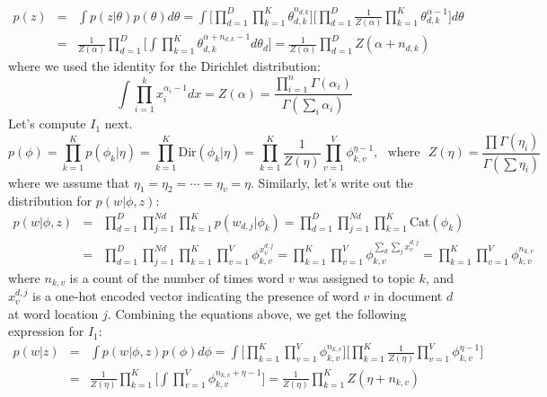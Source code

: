 \begin{eqnarray}
p(z) &=& \int p(z|\theta) p(\theta) d\theta = \int \bigg[\prod_{d=1}^{D}\prod_{k=1}^{K}\theta_{d,k}^{n_{d,k}}\bigg] \bigg[\prod_{d=1}^{D}\frac{1}{Z(\alpha)}\prod_{k=1}^{K}\theta_{d,k}^{\alpha - 1}\bigg] d\theta \nonumber \\
&=& \frac{1}{Z(\alpha)}\prod_{d=1}^{D}\bigg[ \int \prod_{k=1}^{K}\theta_{d,k}^{\alpha + n_{d,k} - 1} d\theta_d \bigg] = \frac{1}{Z(\alpha)}\prod_{d=1}^{D}Z(\alpha + n_{d,k})
\end{eqnarray}
where we used the identity for the Dirichlet distribution:
\begin{equation}
    \int \prod_{i=1}^{k} x_{i}^{\alpha_i - 1} dx = Z(\alpha) = \frac{\prod_{i=1}^{n}\Gamma(\alpha_i)}{\Gamma(\sum_i \alpha_i)}
\end{equation}
Let's compute $I_1$ next.
\begin{equation}
    p(\phi) = \prod_{k=1}^{K}p(\phi_k|\eta) = \prod_{k=1}^{K}\mathrm{Dir}(\phi_k|\eta) = \prod_{k=1}^{K}\frac{1}{Z(\eta)}\prod_{v=1}^{V}\phi_{k,v}^{\eta - 1}, ~~~\mathrm{where}~~~Z(\eta) = \frac{\prod \Gamma(\eta_i)}{\Gamma(\sum \eta_i)}
\end{equation}
where we assume that $\eta_1 = \eta_2 = \cdots = \eta_v = \eta$. Similarly, let's write out the distribution for $p(w|\phi, z)$:
\begin{eqnarray}
    p(w|\phi, z) &=& \prod_{d=1}^{D}\prod_{j=1}^{Nd} \prod_{k=1}^{K}p(w_{d,j}|\phi_k) =  \prod_{d=1}^{D}\prod_{j=1}^{Nd} \prod_{k=1}^{K} \mathrm{Cat}(\phi_k) \nonumber \\
&=& \prod_{d=1}^{D}\prod_{j=1}^{Nd} \prod_{k=1}^{K} \prod_{v=1}^{V} \phi_{k,v}^{x_{v}^{d,j}} = \prod_{k=1}^{K} \prod_{v=1}^{V} \phi_{k,v}^{\sum_d \sum_j x_{v}^{d,j}} =  \prod_{k=1}^{K} \prod_{v=1}^{V} \phi_{k,v}^{n_{k,v}}
\end{eqnarray}
where $n_{k,v}$ is a count of the number of times word $v$ was assigned to topic $k$, and $x_{v}^{d,j}$ is a one-hot encoded vector indicating the presence of word $v$ in document $d$ at word location $j$. Combining the equations above, we get the following expression for $I_1$:
\begin{eqnarray}
    p(w|z) &=& \int p(w|\phi, z) p(\phi) d\phi = \int \bigg[\prod_{k=1}^{K} \prod_{v=1}^{V} \phi_{k,v}^{n_{k,v}}\bigg] \bigg[\prod_{k=1}^{K}\frac{1}{Z(\eta)}\prod_{v=1}^{V}\phi_{k,v}^{\eta - 1} \bigg] \nonumber \\
&=& \frac{1}{Z(\eta)}\prod_{k=1}^{K}\bigg[\int \prod_{v=1}^{V}\phi_{k,v}^{n_{k,v}+\eta - 1}\bigg] = \frac{1}{Z(\eta)}\prod_{k=1}^{K}Z(\eta + n_{k,v})
\end{eqnarray}
